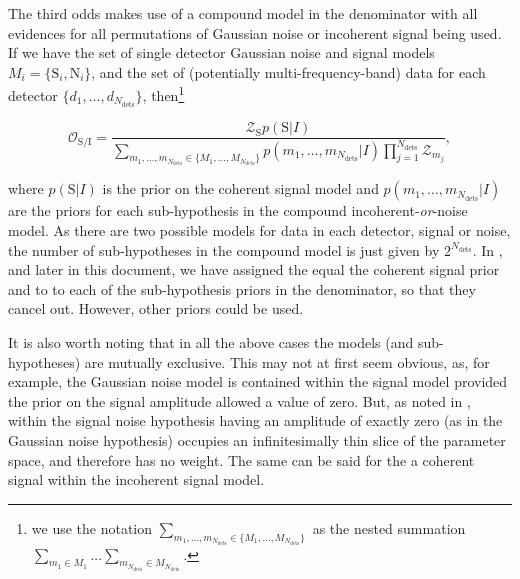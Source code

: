 The third odds makes use of a compound model in the denominator with all evidences for all permutations of Gaussian noise or incoherent signal being used.
If we have the set of single detector Gaussian noise and signal models $M_i = \{\text{S}_i, \text{N}_i\}$, and the set of (potentially
multi-frequency-band) data for each detector $\{d_1, \ldots, d_{N_{\text{dets}}}\}$, then\footnote{we use the notation
$\sum_{m_1, \ldots, m_{N_{\text{dets}}}\in\{M_1, \ldots, M_{N_{\text{dets}}}\}}$ as the nested summation $\sum_{m_1 \in M_1}\ldots\sum_{m_{N_{\text{dets}}}\in M_{N_{\text{dets}}}}$.}
\begin{widetext}
\begin{equation}\label{eq:cohvincoh2}
 \mathcal{O}_{\text{S}/\text{I}} = \frac{\mathcal{Z}_{\text{S}}p(\text{S}|I)}{\sum_{m_1, \ldots, m_{N_{\text{dets}}}\in\{M_1, \ldots, M_{N_{\text{dets}}} \} } 
p(m_1,\ldots,m_{N_{\text{dets}}}|I)\prod_{j=1}^{N_{\text{dets}}} \mathcal{Z}_{m_j}},
\end{equation}
\end{widetext}
where $p(\text{S}|I)$ is the prior on the coherent signal model and $p(m_1,\ldots,m_{N_{\text{dets}}}|I)$ are the priors for each sub-hypothesis in the
compound incoherent-{\it or}-noise model. As there are two possible models for data in each detector, signal or noise, the number of sub-hypotheses
in the compound model is just given by $2^{N_{\text{dets}}}$. In \citet{2017arXiv170107709T}, and later in this 
document, we have assigned the equal the coherent signal prior
and to to each of the sub-hypothesis priors in the denominator, so that they cancel out. However, other priors could be used.

It is also worth noting that in all the above cases the models (and sub-hypotheses) are mutually exclusive. This may not at first seem obvious, as,
for example, the Gaussian noise model is contained within the signal model provided the prior on the signal amplitude allowed a value of zero. But, as noted in
\citet{2012PhRvD..85h2003L, MaxCWpolariations}, within the signal noise hypothesis having an amplitude of exactly zero (as in the Gaussian
noise hypothesis) occupies an infinitesimally thin slice of the parameter space, and therefore has no weight. The same can be said for the a coherent
signal within the incoherent signal model.

